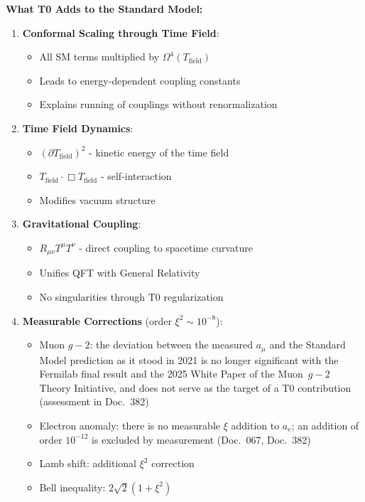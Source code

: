 	\textbf{What T0 Adds to the Standard Model:}
	
	\begin{tcolorbox}[colback=blue!5!white,colframe=blue!75!black,title=T0 Contributions to the Extended Lagrange Density]
		\begin{enumerate}
			\item \textbf{Conformal Scaling through Time Field}:
			\begin{itemize}
				\item All SM terms multiplied by $\Omega^4(T_{\text{field}})$
				\item Leads to energy-dependent coupling constants
				\item Explains running of couplings without renormalization
			\end{itemize}
			
			\item \textbf{Time Field Dynamics}:
			\begin{itemize}
				\item $(\partial T_{\text{field}})^2$ - kinetic energy of the time field
				\item $T_{\text{field}} \cdot \Box T_{\text{field}}$ - self-interaction
				\item Modifies vacuum structure
			\end{itemize}
			
			\item \textbf{Gravitational Coupling}:
			\begin{itemize}
				\item $R_{\mu\nu} T^{\mu} T^{\nu}$ - direct coupling to spacetime curvature
				\item Unifies QFT with General Relativity
				\item No singularities through T0 regularization
			\end{itemize}
			
			\item \textbf{Measurable Corrections} (order $\xi^2 \sim 10^{-8}$):
			\begin{itemize}
				\item Muon $g-2$: the deviation between the measured $a_\mu$ and the Standard Model prediction as it stood in 2021 is no longer significant with the Fermilab final result and the 2025 White Paper of the Muon~$g-2$ Theory Initiative, and does not serve as the target of a T0 contribution (assessment in Doc.~382)
				\item Electron anomaly: there is no measurable $\xi$ addition to $a_e$; an addition of order $10^{-12}$ is excluded by measurement (Doc.~067, Doc.~382)
				\item Lamb shift: additional $\xi^2$ correction
				\item Bell inequality: $2\sqrt{2}(1 + \xi^2)$
			\end{itemize}
		\end{enumerate}
	\end{tcolorbox}
	
